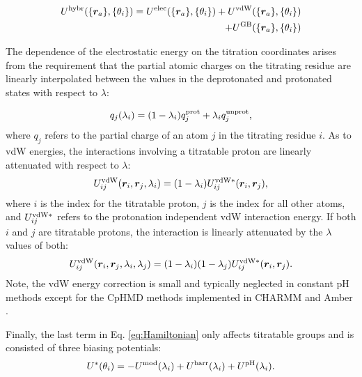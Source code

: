  \begin{equation}
\label{eq:Uhybr}
\begin{split}
U^{\rm hybr}(\{\bm{r}_a\},\{\theta_i\})=U^{\rm elec}(\{\bm{r}_a\},\{\theta_i\}) 
+ U^{\rm vdW}(\{\bm{r}_a\},\{\theta_i\})\\
+ U^{\rm GB}(\{\bm{r}_a\},\{\theta_i\})
\end{split}
\end{equation}

The dependence of the electrostatic energy on the titration coordinates arises from the requirement that
the partial atomic charges on the titrating residue
are linearly interpolated  
between the values in the deprotonated and protonated states with respect to $\lambda$:

%
\begin{equation}
q_j(\lambda_i) = (1-\lambda_i) q_j^{\rm prot} +  \lambda_i q_j^{\rm unprot},
\label{eq:qlamb}
\end{equation}
where $q_j$ refers to the partial charge of an atom $j$ in the titrating residue $i$.
As to vdW energies, the 
interactions involving a titratable proton are linearly attenuated with respect to $\lambda$:
\begin{equation}
U^{\rm vdW}_{ij}(\bm r_i, \bm r_j, \lambda_i) = (1-\lambda_i)U^{\rm vdW\ast}_{ij}(\bm r_i, \bm r_j),
\end{equation}
where $i$ is the index for the titratable proton, $j$ is the index for all other atoms, and $U^{\rm vdW \ast}_{ij}$ refers to the protonation independent vdW interaction energy. If both $i$ and $j$ are titratable protons,
the interaction is linearly attenuated by the $\lambda$ values of both:
\begin{equation}
U^{\rm vdW}_{ij}(\bm r_i, \bm r_j, \lambda_i, \lambda_j) = (1-\lambda_i)(1-\lambda_j)U^{\rm vdW\ast}_{ij}(\bm r_i, \bm r_j).
\end{equation}
Note, the vdW energy correction is small and typically neglected in constant pH methods except for the CpHMD methods implemented in CHARMM and Amber \cite{Khandogin_Brooks_2005_Biophys.J.,Wallace_Shen_2011_J.Chem.TheoryComput.,Huang_Shen_2016_J.Chem.TheoryComput.,Huang_Shen_2018_J.Chem.Inf.Model.,Harris_Shen_2019_J.Chem.Inf.Model.}.

Finally, the last term in Eq. \ref{eq:Hamiltonian} 
only affects titratable groups and is consisted of 
three biasing potentials:
\begin{equation}
\label{eq:biasingpotential}
U^{\ast}(\theta_i)=-U^{\rm mod}(\lambda_i)+U^{\rm barr}(\lambda_i)+U^{\rm pH}(\lambda_i).
\end{equation}

